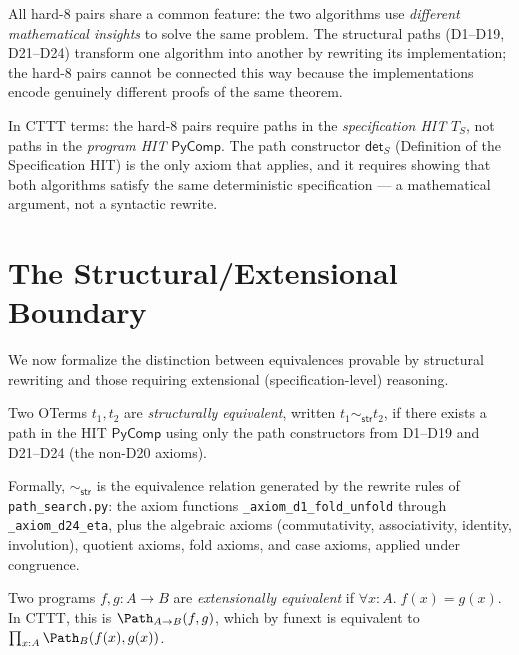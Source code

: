 All hard-8 pairs share a common feature: the two algorithms use
\emph{different mathematical insights} to solve the same problem.
The structural paths (D1--D19, D21--D24) transform one algorithm
into another by rewriting its implementation; the hard-8 pairs
cannot be connected this way because the implementations encode
genuinely different proofs of the same theorem.

In CTTT terms: the hard-8 pairs require paths in the
\emph{specification HIT} $T_S$, not paths in the \emph{program HIT}
$\mathsf{PyComp}$.  The path constructor $\mathsf{det}_S$
(Definition of the Specification HIT) is the only axiom that
applies, and it requires showing that both algorithms satisfy the
same deterministic specification --- a mathematical argument, not a
syntactic rewrite.


\section{The Structural/Extensional Boundary}
\label{sec:boundary}

We now formalize the distinction between equivalences provable by
structural rewriting and those requiring extensional (specification-level)
reasoning.

\begin{definition}
\label{def:structural-equiv}
Two OTerms $t_1, t_2$ are \emph{structurally equivalent}, written
$t_1 \sim_{\mathsf{str}} t_2$, if there exists a path in the HIT
$\mathsf{PyComp}$ using only the path constructors from D1--D19
and D21--D24 (the non-D20 axioms).

Formally, $\sim_{\mathsf{str}}$ is the equivalence relation generated
by the rewrite rules of \texttt{path\_search.py}: the axiom functions
\texttt{\_axiom\_d1\_fold\_unfold} through
\texttt{\_axiom\_d24\_eta}, plus the algebraic axioms
(commutativity, associativity, identity, involution), quotient axioms,
fold axioms, and case axioms, applied under congruence.
\end{definition}

\begin{definition}
\label{def:ext-equiv}
Two programs $f, g : A \to B$ are \emph{extensionally equivalent}
if $\forall x : A.\; f(x) = g(x)$.  In CTTT, this is
$\Path_{A \to B}(f, g)$, which by funext is equivalent to
$\prod_{x:A} \Path_B(f(x), g(x))$.
\end{definition}

